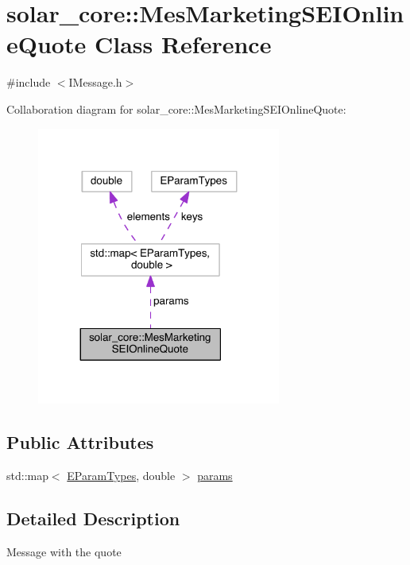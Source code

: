 \hypertarget{classsolar__core_1_1_mes_marketing_s_e_i_online_quote}{}\section{solar\+\_\+core\+:\+:Mes\+Marketing\+S\+E\+I\+Online\+Quote Class Reference}
\label{classsolar__core_1_1_mes_marketing_s_e_i_online_quote}


{\ttfamily \#include $<$I\+Message.\+h$>$}



Collaboration diagram for solar\+\_\+core\+:\+:Mes\+Marketing\+S\+E\+I\+Online\+Quote\+:\nopagebreak
\begin{figure}[H]
\begin{center}
\leavevmode
\includegraphics[width=227pt]{classsolar__core_1_1_mes_marketing_s_e_i_online_quote__coll__graph}
\end{center}
\end{figure}
\subsection*{Public Attributes}
\begin{DoxyCompactItemize}
\item 
std\+::map$<$ \hyperlink{namespacesolar__core_aa1147341e5ef7a40d68d1bd68e149362}{E\+Param\+Types}, double $>$ \hyperlink{classsolar__core_1_1_mes_marketing_s_e_i_online_quote_a985cbf3eb866c4488f0de003c4090aaf}{params}
\end{DoxyCompactItemize}


\subsection{Detailed Description}
Message with the quote

